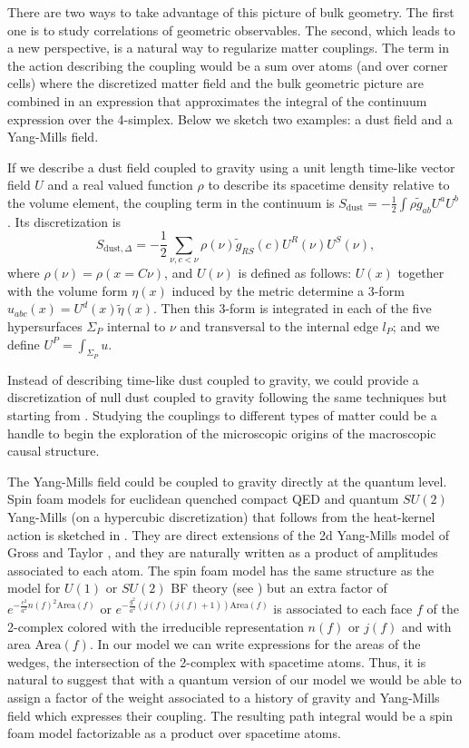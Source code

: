 \documentclass{article}
\begin{document}
There are two ways to take advantage of this picture of bulk geometry. The first one is to study correlations of geometric observables. The second, which leads to a new perspective, is a natural way to regularize matter couplings. The term in the action describing the coupling would be a sum over atoms (and over corner cells) where the discretized matter field and the bulk geometric picture are combined in an expression that approximates the integral of the continuum expression over the 4-simplex. Below we sketch two examples: a dust field and a Yang-Mills field. 

If we describe a dust field coupled to gravity using a unit length time-like vector field $U$ and a real valued function $\rho$ to describe its spacetime density relative to the volume element, the coupling term in the continuum is $S_{\mbox{dust}}= -\frac{1}{2} \int \rho \tilde{g}_{ab} U^a U^b$ %
\cite{dust}. Its discretization is 
\[
S_{\mbox{dust}, \Delta}= -\frac{1}{2} \sum_{\nu , c<\nu} \rho(\nu) \tilde{g}_{RS}(c) U^R(\nu) U^S(\nu), 
\]
where $\rho(\nu) = \rho (x = C\nu)$, and $U(\nu)$ is defined as follows: 
$U(x)$ together with the volume form $\eta(x)$ induced by the metric determine a 3-form $u_{abc}(x) = U^d(x) \tilde{\eta}(x)$. 
Then this 3-form is integrated in each of the five hypersurfaces $\Sigma_P$ internal to $\nu$ and transversal to the internal edge $l_P$; 
and we define $U^P = \int_{\Sigma_P} u$. 

Instead of describing time-like dust coupled to gravity, we could provide a discretization of null dust coupled to gravity following the same techniques but starting from \cite{nulldust}. Studying the couplings to different types of matter could be a handle to begin the exploration of the microscopic origins of the macroscopic causal structure. 


The Yang-Mills field could be coupled to gravity directly at the quantum level. 
Spin foam models for euclidean quenched compact QED and quantum $SU(2)$ Yang-Mills (on a hypercubic discretization) 
that follows from the heat-kernel action \cite{heat-kernel} is sketched in \cite{Rei2}. They are direct extensions of the 2d Yang-Mills model of Gross and Taylor \cite{Gross-Taylor}, and they are naturally written as a product of amplitudes associated to each atom. 
The spin foam model has the same structure as the model for $U(1)$ or $SU(2)$ BF theory (see \cite{Perez1}) but an extra factor of 
$e^{-\frac{e^2}{a^2} n(f)^2 \mbox{Area}(f)}$
or $e^{-\frac{g^2}{a^2} (j(f)(j(f)+1)) \mbox{Area}(f)}$ is associated to each face $f$ of the 2-complex colored with the irreducible representation $n(f)$ or $j(f)$ and with area $\mbox{Area}(f)$. 
%
In our model we can write expressions for the areas of the wedges, the intersection of the 2-complex with spacetime atoms. 
Thus, it is natural to suggest that with a quantum version of our model we would be able to assign a factor of the weight associated to a history of gravity and Yang-Mills field which expresses their coupling. The resulting path integral would be a spin foam model factorizable as a product over spacetime atoms. 
\end{document}

